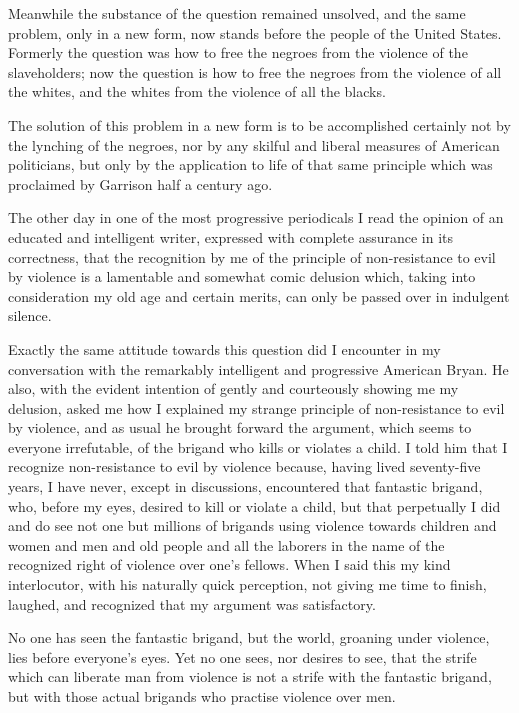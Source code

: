 \documentclass{book}
\begin{document}
Meanwhile the substance of the question remained unsolved, and the same problem, only in a new form, now stands before the people of the United States. Formerly the question was how to free the negroes from the violence of the slaveholders; now the question is how to free the negroes from the violence of all the whites, and the whites from the violence of all the blacks.

The solution of this problem in a new form is to be accomplished certainly not by the lynching of the negroes, nor by any skilful and liberal measures of American politicians, but only by the application to life of that same principle which was proclaimed by Garrison half a century ago.

The other day in one of the most progressive periodicals I read the opinion of an educated and intelligent writer, expressed with complete assurance in its correctness, that the recognition by me of the principle of non-resistance to evil by violence is a lamentable and somewhat comic delusion which, taking into consideration my old age and certain merits, can only be passed over in indulgent silence.

Exactly the same attitude towards this question did I encounter in my conversation with the remarkably intelligent and progressive American Bryan. He also, with the evident intention of gently and courteously showing me my delusion, asked me how I explained my strange principle of non-resistance to evil by violence, and as usual he brought forward the argument, which seems to everyone irrefutable, of the brigand who kills or violates a child. I told him that I recognize non-resistance to evil by violence because, having lived seventy-five years, I have never, except in discussions, encountered that fantastic brigand, who, before my eyes, desired to kill or violate a child, but that perpetually I did and do see not one but millions of brigands using violence towards children and women and men and old people and all the laborers in the name of the recognized right of violence over one’s fellows. When I said this my kind interlocutor, with his naturally quick perception, not giving me time to finish, laughed, and recognized that my argument was satisfactory.

No one has seen the fantastic brigand, but the world, groaning under violence, lies before everyone’s eyes. Yet no one sees, nor desires to see, that the strife which can liberate man from violence is not a strife with the fantastic brigand, but with those actual brigands who practise violence over men.
\end{document}
